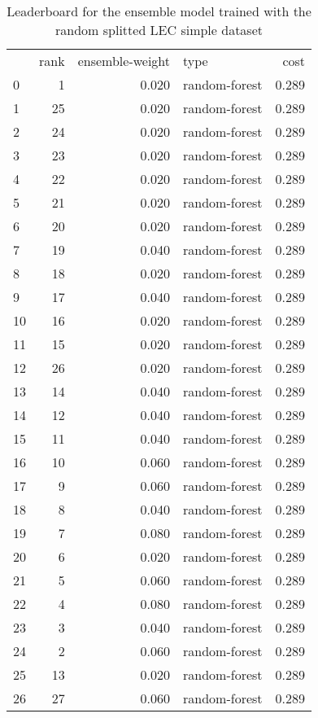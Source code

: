 \begin{table}[]
	\centering
	\begin{tabular}{lrrlr}
		   & rank & ensemble-weight & type          & cost  \\
		0  & 1    & 0.020           & random-forest & 0.289 \\
		1  & 25   & 0.020           & random-forest & 0.289 \\
		2  & 24   & 0.020           & random-forest & 0.289 \\
		3  & 23   & 0.020           & random-forest & 0.289 \\
		4  & 22   & 0.020           & random-forest & 0.289 \\
		5  & 21   & 0.020           & random-forest & 0.289 \\
		6  & 20   & 0.020           & random-forest & 0.289 \\
		7  & 19   & 0.040           & random-forest & 0.289 \\
		8  & 18   & 0.020           & random-forest & 0.289 \\
		9  & 17   & 0.040           & random-forest & 0.289 \\
		10 & 16   & 0.020           & random-forest & 0.289 \\
		11 & 15   & 0.020           & random-forest & 0.289 \\
		12 & 26   & 0.020           & random-forest & 0.289 \\
		13 & 14   & 0.040           & random-forest & 0.289 \\
		14 & 12   & 0.040           & random-forest & 0.289 \\
		15 & 11   & 0.040           & random-forest & 0.289 \\
		16 & 10   & 0.060           & random-forest & 0.289 \\
		17 & 9    & 0.060           & random-forest & 0.289 \\
		18 & 8    & 0.040           & random-forest & 0.289 \\
		19 & 7    & 0.080           & random-forest & 0.289 \\
		20 & 6    & 0.020           & random-forest & 0.289 \\
		21 & 5    & 0.060           & random-forest & 0.289 \\
		22 & 4    & 0.080           & random-forest & 0.289 \\
		23 & 3    & 0.040           & random-forest & 0.289 \\
		24 & 2    & 0.060           & random-forest & 0.289 \\
		25 & 13   & 0.020           & random-forest & 0.289 \\
		26 & 27   & 0.060           & random-forest & 0.289 \\
	\end{tabular}

	\caption{Leaderboard for the ensemble model trained with the random splitted LEC simple dataset}
	\label{tab:lb-lec-games-simple-randsplit}
\end{table}

